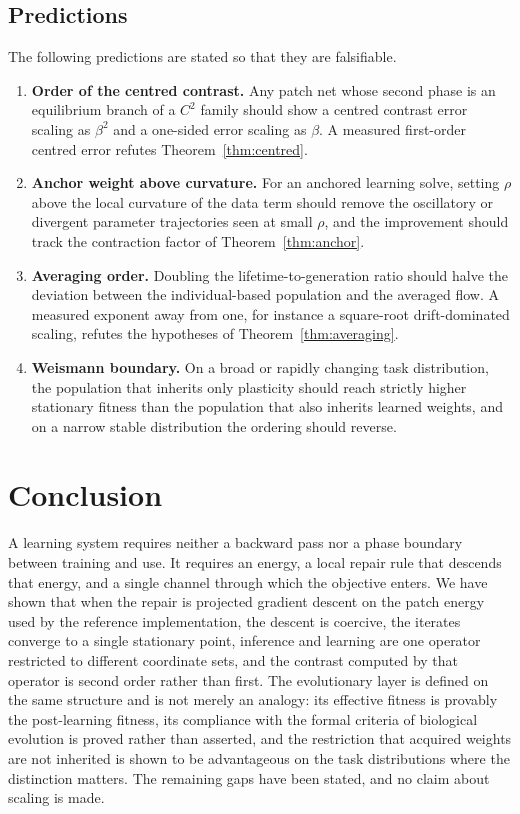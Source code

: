 \documentclass[11pt]{article}
\theoremstyle{definition}
\theoremstyle{remark}
\begin{document}
\subsection{Predictions}
The following predictions are stated so that they are falsifiable.
\begin{enumerate}
\item \textbf{Order of the centred contrast.} Any patch net whose second phase is an equilibrium branch
of a $C^2$ family should show a centred contrast error scaling as $\beta^2$ and a one-sided error
scaling as $\beta$. A measured first-order centred error refutes Theorem~\ref{thm:centred}.
\item \textbf{Anchor weight above curvature.} For an anchored learning solve, setting $\rho$ above the
local curvature of the data term should remove the oscillatory or divergent parameter trajectories seen
at small $\rho$, and the improvement should track the contraction factor of Theorem~\ref{thm:anchor}.
\item \textbf{Averaging order.} Doubling the lifetime-to-generation ratio should halve the deviation
between the individual-based population and the averaged flow. A measured exponent away from one, for
instance a square-root drift-dominated scaling, refutes the hypotheses of Theorem~\ref{thm:averaging}.
\item \textbf{Weismann boundary.} On a broad or rapidly changing task distribution, the population that
inherits only plasticity should reach strictly higher stationary fitness than the population that also
inherits learned weights, and on a narrow stable distribution the ordering should reverse.
\end{enumerate}

\section{Conclusion}
A learning system requires neither a backward pass nor a phase boundary between training and use. It
requires an energy, a local repair rule that descends that energy, and a single channel through which
the objective enters. We have shown that when the repair is projected gradient descent on the patch
energy used by the reference implementation, the descent is coercive, the iterates converge to a single
stationary point, inference and learning are one operator restricted to different coordinate sets, and
the contrast computed by that operator is second order rather than first. The evolutionary layer is
defined on the same structure and is not merely an analogy: its effective fitness is provably the
post-learning fitness, its compliance with the formal criteria of biological evolution is proved rather
than asserted, and the restriction that acquired weights are not inherited is shown to be advantageous
on the task distributions where the distinction matters. The remaining gaps have been stated, and no
claim about scaling is made.
\end{document}
